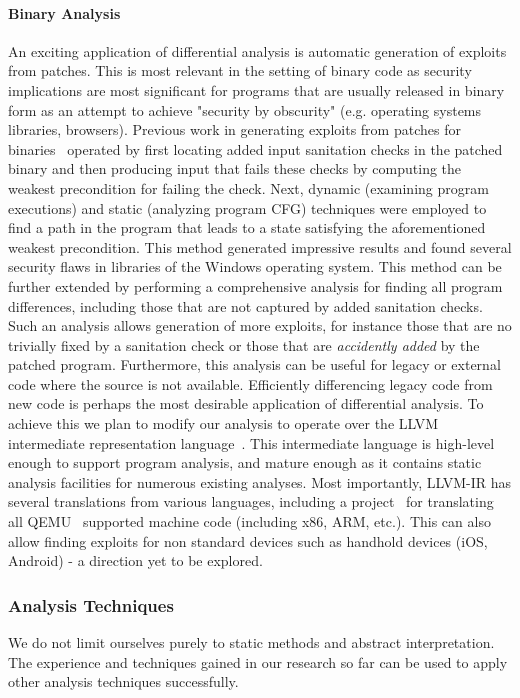 \paragraph{Binary Analysis}
An exciting application of differential analysis is automatic generation of exploits from patches. This is most relevant in the setting of binary code as security implications are most significant for programs that are usually released in binary form as an attempt to achieve "security by obscurity" (e.g. operating systems libraries, browsers). Previous work in generating exploits from patches for binaries~\cite{BrumleyPoosankamSongZheng08} operated by first locating added input sanitation checks in the patched binary and then producing input that fails these checks by computing the weakest precondition for failing the check. Next, dynamic (examining program executions) and static (analyzing program CFG) techniques were employed to find a path in the program that leads to a state satisfying the aforementioned weakest precondition. This method generated impressive results and found several security flaws in libraries of the Windows operating system. This method can be further extended by performing a comprehensive analysis for finding all program differences, including those that are not captured by added sanitation checks. Such an analysis allows generation of more exploits, for instance those that are no trivially fixed by a sanitation check or those that are \emph{accidently added} by the patched program. Furthermore, this analysis can be useful for legacy or external code where the source is not available. Efficiently differencing legacy code from new code is perhaps the most desirable application of differential analysis. To achieve this we plan to modify our analysis to operate over the LLVM intermediate representation language~\cite{LattnerAdve04}. This intermediate language is high-level enough to support program analysis, and mature enough as it contains static analysis facilities for numerous existing analyses. Most importantly, LLVM-IR has several translations from various languages, including a project~\cite{Scheller:2009} for translating all QEMU~\cite{Bellard05} supported machine code (including x86, ARM, etc.). This can also allow finding exploits for non standard devices such as handhold devices (iOS, Android) - a direction yet to be explored.

\subsubsection{Analysis Techniques}
We do not limit ourselves purely to static methods and abstract interpretation. The experience and techniques gained in our research so far can be used to apply other analysis techniques successfully.

